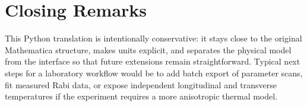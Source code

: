 \documentclass[11pt,a4paper]{article}
\begin{document}
\section{Closing Remarks}

This Python translation is intentionally conservative: it stays close to the original Mathematica
structure, makes units explicit, and separates the physical model from the interface so that future
extensions remain straightforward. Typical next steps for a laboratory workflow would be to add
batch export of parameter scans, fit measured Rabi data, or expose independent longitudinal and
transverse temperatures if the experiment requires a more anisotropic thermal model.
\end{document}
